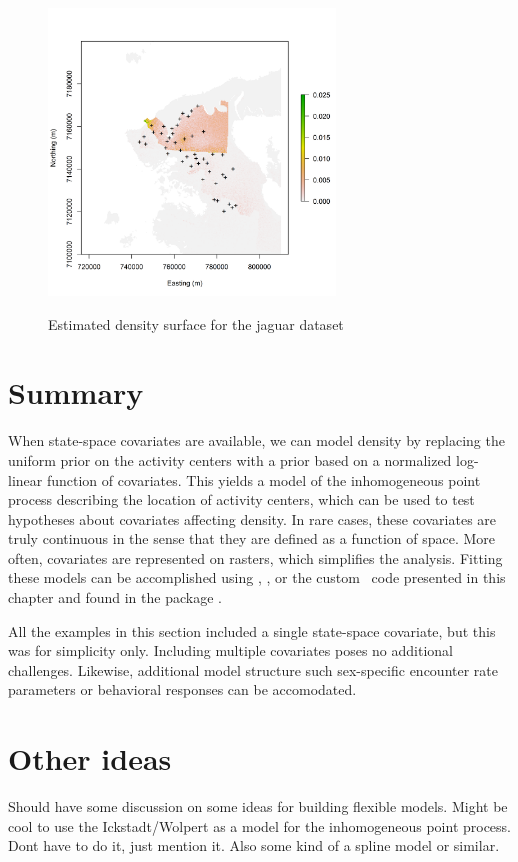 \begin{figure}
\centering
\includegraphics[width=3in,height=3in]{Ch11/figs/Dsurface34}
\label{ch9:fig:Dsurface}
\caption{Estimated density surface for the jaguar dataset}
\end{figure}




\section{Summary}

When state-space covariates are available, we can model
density by replacing the uniform prior on the activity centers with a
prior based on a normalized log-linear function of covariates. This
yields a model of the inhomogeneous point process describing the
location of activity centers, which can be used to test hypotheses
about covariates affecting density. In
rare cases, these covariates are truly continuous in the sense that
they are defined as a function of space. More often, covariates are
represented on rasters, which simplifies the analysis. Fitting these
models can be accomplished using \bugs, \secr, or the custom \R~code
presented in this chapter and found in the package \scrbook.

All the examples in this section included a single state-space
covariate, but this was for simplicity only. Including multiple
covariates poses no additional challenges. Likewise, additional model
structure such sex-specific encounter rate parameters or behavioral
responses can be accomodated.









\section{Other ideas}

Should have some discussion on some ideas for building flexible
models. Might be cool to use the Ickstadt/Wolpert as a model for the
inhomogeneous point process. Dont have to do it, just mention it. Also
some kind of a spline model or similar.
